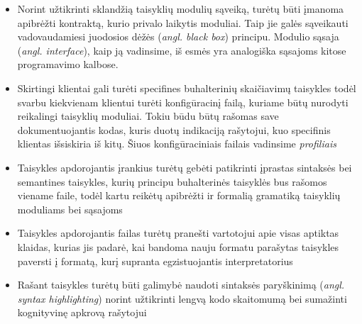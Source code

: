 \begin{activities}
{\begin{itemize}
            \item Norint užtikrinti sklandžią taisyklių modulių sąveiką, turėtų būti įmanoma apibrėžti kontraktą, kurio privalo laikytis moduliai. Taip jie galės sąveikauti vadovaudamiesi juodosios dėžės (\textit{angl. black box}) principu. Modulio sąsaja (\textit{angl. interface}), kaip ją vadinsime, iš esmės yra analogiška sąsajoms kitose programavimo kalbose.

            \item Skirtingi klientai gali turėti specifines buhalterinių skaičiavimų taisykles todėl svarbu kiekvienam klientui turėti konfigūracinį failą, kuriame būtų nurodyti reikalingi taisyklių moduliai. Tokiu būdu būtų rašomas save dokumentuojantis kodas, kuris duotų indikaciją rašytojui, kuo specifinis klientas išsiskiria iš kitų. Šiuos konfigūraciniais failais vadinsime \textit{profiliais}
            
            \item Taisykles apdorojantis įrankius turėtų gebėti patikrinti įprastas sintaksės bei semantines taisykles, kurių principu buhalterinės taisyklės bus rašomos viename faile, todėl kartu reikėtų apibrėžti ir formalią gramatiką taisyklių moduliams bei sąsajoms

            \item Taisykles apdorojantis failas turėtų pranešti vartotojui apie visas aptiktas klaidas, kurias jis padarė, kai bandoma nauju formatu parašytas taisykles paversti į formatą, kurį supranta egzistuojantis interpretatorius
            
            \item Rašant taisykles turėtų būti galimybė naudoti sintaksės paryškinimą (\textit{angl. syntax highlighting}) norint užtikrinti lengvą kodo skaitomumą bei sumažinti kognityvinę apkrovą rašytojui

        \end{itemize}
    }
     \row

\end{activities}
